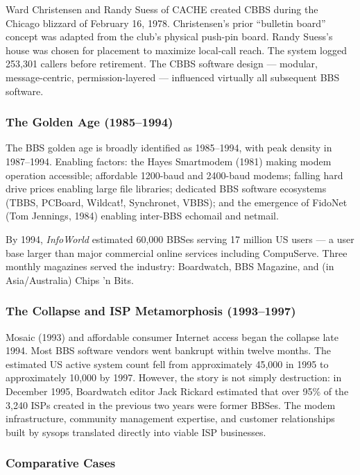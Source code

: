 \documentclass[11pt,letterpaper]{article}
\begin{document}
Ward Christensen and Randy Suess of CACHE created CBBS during the Chicago blizzard of February 16, 1978. Christensen's prior ``bulletin board'' concept was adapted from the club's physical push-pin board. Randy Suess's house was chosen for placement to maximize local-call reach. The system logged 253,301 callers before retirement. The CBBS software design --- modular, message-centric, permission-layered --- influenced virtually all subsequent BBS software.

\subsubsection{The Golden Age (1985--1994)}

The BBS golden age is broadly identified as 1985--1994, with peak density in 1987--1994. Enabling factors: the Hayes Smartmodem (1981) making modem operation accessible; affordable 1200-baud and 2400-baud modems; falling hard drive prices enabling large file libraries; dedicated BBS software ecosystems (TBBS, PCBoard, Wildcat!, Synchronet, VBBS); and the emergence of FidoNet (Tom Jennings, 1984) enabling inter-BBS echomail and netmail.

By 1994, \textit{InfoWorld} estimated 60,000 BBSes serving 17 million US users --- a user base larger than major commercial online services including CompuServe. Three monthly magazines served the industry: Boardwatch, BBS Magazine, and (in Asia/Australia) Chips 'n Bits.

\subsubsection{The Collapse and ISP Metamorphosis (1993--1997)}

Mosaic (1993) and affordable consumer Internet access began the collapse late 1994. Most BBS software vendors went bankrupt within twelve months. The estimated US active system count fell from approximately 45,000 in 1995 to approximately 10,000 by 1997. However, the story is not simply destruction: in December 1995, Boardwatch editor Jack Rickard estimated that over 95\% of the 3,240 ISPs created in the previous two years were former BBSes. The modem infrastructure, community management expertise, and customer relationships built by sysops translated directly into viable ISP businesses.

\subsubsection{Comparative Cases}
\end{document}
